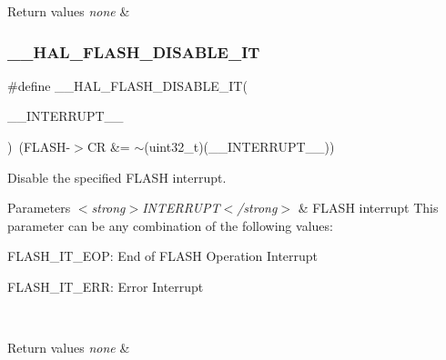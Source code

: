 \begin{DoxyRetVals}{Return values}
{\em none} & \\
\hline
\end{DoxyRetVals}
\mbox{\label{group___f_l_a_s_h___exported___macros_ga1f40f507b5d4b3a4da68e4244a1097ee}} 
\subsubsection{\texorpdfstring{\_\_HAL\_FLASH\_DISABLE\_IT}{\_\_HAL\_FLASH\_DISABLE\_IT}}
{\footnotesize\ttfamily \#define \+\_\+\+\_\+\+H\+A\+L\+\_\+\+F\+L\+A\+S\+H\+\_\+\+D\+I\+S\+A\+B\+L\+E\+\_\+\+IT(\begin{DoxyParamCaption}\item[{}]{\+\_\+\+\_\+\+I\+N\+T\+E\+R\+R\+U\+P\+T\+\_\+\+\_\+ }\end{DoxyParamCaption})~(F\+L\+A\+SH-\/$>$CR \&= $\sim$(uint32\+\_\+t)(\+\_\+\+\_\+\+I\+N\+T\+E\+R\+R\+U\+P\+T\+\_\+\+\_\+))}



Disable the specified F\+L\+A\+SH interrupt. 


\begin{DoxyParams}{Parameters}
{\em $<$strong$>$\+I\+N\+T\+E\+R\+R\+U\+P\+T$<$/strong$>$} & F\+L\+A\+SH interrupt This parameter can be any combination of the following values\+: \begin{DoxyItemize}
\item F\+L\+A\+S\+H\+\_\+\+I\+T\+\_\+\+E\+OP\+: End of F\+L\+A\+SH Operation Interrupt \item F\+L\+A\+S\+H\+\_\+\+I\+T\+\_\+\+E\+RR\+: Error Interrupt \end{DoxyItemize}
\\
\hline
\end{DoxyParams}

\begin{DoxyRetVals}{Return values}
{\em none} & \\
\hline
\end{DoxyRetVals}
\mbox{\label{group___f_l_a_s_h___exported___macros_ga13fa137a911f02a2f94fb9fb0762a340}} 
